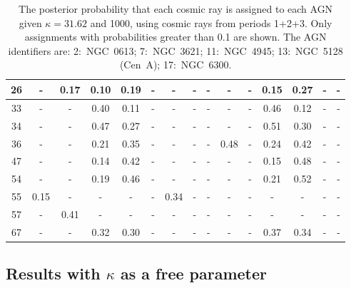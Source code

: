 \begin{sidewaystable}
\begin{center}
\begin{tabular}{|c|c|c|c|c|c|c|c|c|c|c|c|c|c|c|}
 26 &   -  & 0.17 & 0.10 & 0.19 &   -  &   -   &   -    &   -    &   -    &   -    & 0.15  & 0.27  &   -    &   -   \\
 \hline
 33 &   -  &   -  & 0.40 & 0.11 &   -  &   -   &   -    &   -    &   -    &   -    & 0.46  & 0.12  &   -    &   -   \\
 34 &   -  &   -  & 0.47 & 0.27 &   -  &   -   &   -    &   -    &   -    &   -    & 0.51  & 0.30  &   -    &   -   \\
 36 &   -  &   -  & 0.21 & 0.35 &   -  &   -   &   -    &   -    & 0.48   &   -    & 0.24  & 0.42  &   -    &   -   \\
 47 &   -  &   -  & 0.14 & 0.42 &   -  &   -   &   -    &   -    &   -    &   -    & 0.15  & 0.48  &   -    &   -   \\
 54 &   -  &   -  & 0.19 & 0.46 &   -  &   -   &   -    &   -    &   -    &   -    & 0.21  & 0.52  &   -    &   -   \\
 55 & 0.15 &   -  &   -  &   -  &   -  & 0.34  &   -    &   -    &   -    &   -    &   -   &   -   &   -    &   -   \\
 57 &   -  & 0.41 &   -  &   -  &   -  &   -   &   -    &   -    &   -    &   -    &   -   &   -   &   -    &   -   \\
 67 &   -  &   -  & 0.32 & 0.30 &   -  &   -   &   -    &   -    &   -    &   -    & 0.37  & 0.34  &   -    &   -   \\
 \hline

\end{tabular}
\end{center}
\caption{The posterior probability that each cosmic ray is assigned to each
AGN given $\kappa = 31.62$ and 1000, using cosmic rays from periods 1+2+3.
Only assignments with probabilities greater than 0.1 are shown.  The AGN
identifiers are:  2:~NGC~0613; 7:~NGC~3621; 11:~NGC~4945;
13:~NGC~5128  (Cen~A); 17:~NGC~6300.}
\label{lambdaTable}
\end{sidewaystable}


\subsection{Results with $\kappa$ as a free parameter}


